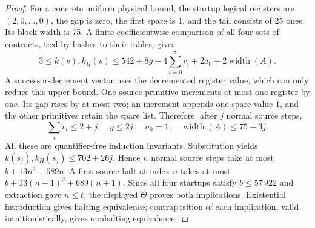 \begin{proof}
For a concrete uniform physical bound, the startup logical registers
are $(2,0,\ldots,0)$, the gap is zero, the first spare is 1, and the tail
consists of 25 ones. Its block width is 75. A finite coefficientwise
comparison of all four sets of contracts, tied by hashes to their tables,
gives
\[
 3\le k(s),k_H(s)\le
 542+8g+4\sum_{i=0}^{8}r_i+2a_0+2\operatorname{width}(A).
\]
A successor-decrement vector uses the decremented register value, which
can only reduce this upper bound. One source primitive increments at
most one register by one. Its gap rises by at most two; an increment
appends one spare value 1, and the other primitives retain the spare
list. Therefore, after $j$ normal source steps,
\[
 \sum_i r_i\le2+j,\quad g\le2j,\quad a_0=1,
 \quad\operatorname{width}(A)\le75+3j.
\]
All these are quantifier-free induction invariants. Substitution yields
$k(s_j),k_H(s_j)\le702+26j$. Hence $n$ normal source steps take at most
$b+13n^2+689n$. A first source halt at index $n$ takes at most
$b+13(n+1)^2+689(n+1)$. Since all four startups satisfy $b\le57\,922$
and extraction gave $n\le t$, the displayed $\Theta$ proves both
implications. Existential introduction gives halting equivalence;
contraposition of each implication, valid intuitionistically, gives
nonhalting equivalence.
\end{proof}

